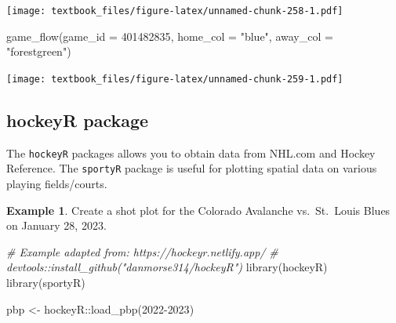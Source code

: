 \documentclass[
  11pt,
]{book}
\newenvironment{Shaded}{\begin{snugshade}}{\end{snugshade}}
\newcommand{\AttributeTok}[1]{\textcolor[rgb]{0.77,0.63,0.00}{#1}}
\newcommand{\CommentTok}[1]{\textcolor[rgb]{0.56,0.35,0.01}{\textit{#1}}}
\newcommand{\DecValTok}[1]{\textcolor[rgb]{0.00,0.00,0.81}{#1}}
\newcommand{\FunctionTok}[1]{\textcolor[rgb]{0.00,0.00,0.00}{#1}}
\newcommand{\NormalTok}[1]{#1}
\newcommand{\OtherTok}[1]{\textcolor[rgb]{0.56,0.35,0.01}{#1}}
\newcommand{\SpecialCharTok}[1]{\textcolor[rgb]{0.00,0.00,0.00}{#1}}
\newcommand{\StringTok}[1]{\textcolor[rgb]{0.31,0.60,0.02}{#1}}
\theoremstyle{definition}
\theoremstyle{definition}
\newtheorem{example}{Example}[chapter]
\theoremstyle{definition}
\theoremstyle{definition}
\theoremstyle{remark}
\begin{document}
\texttt{[image: textbook\_files/figure-latex/unnamed-chunk-258-1.pdf]}
\newpage

\begin{Shaded}
\begin{Highlighting}[]
\FunctionTok{game\_flow}\NormalTok{(}\AttributeTok{game\_id =} \DecValTok{401482835}\NormalTok{, }\AttributeTok{home\_col =} \StringTok{"blue"}\NormalTok{, }\AttributeTok{away\_col =} \StringTok{"forestgreen"}\NormalTok{)}
\end{Highlighting}
\end{Shaded}

\texttt{[image: textbook\_files/figure-latex/unnamed-chunk-259-1.pdf]}

\newpage

\hypertarget{hockeyr-package}{%
\subsection{hockeyR package}\label{hockeyr-package}}

The \texttt{hockeyR} packages allows you to obtain data from NHL.com and Hockey Reference. The \texttt{sportyR} package is useful for plotting spatial data on various playing fields/courts.

\begin{example}
Create a shot plot for the Colorado Avalanche vs.~St.~Louis Blues on January 28, 2023.
\end{example}

\begin{Shaded}
\begin{Highlighting}[]
\CommentTok{\# Example adapted from: https://hockeyr.netlify.app/}
\CommentTok{\# devtools::install\_github("danmorse314/hockeyR")}
\FunctionTok{library}\NormalTok{(hockeyR)}
\FunctionTok{library}\NormalTok{(sportyR)}

\NormalTok{pbp }\OtherTok{\textless{}{-}}\NormalTok{ hockeyR}\SpecialCharTok{::}\FunctionTok{load\_pbp}\NormalTok{(}\StringTok{\textquotesingle{}2022{-}2023\textquotesingle{}}\NormalTok{)}
\end{Highlighting}
\end{Shaded}
\end{document}
